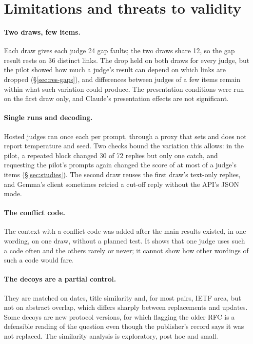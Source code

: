 \section{Limitations and threats to validity}
\label{sec:limitations}

\paragraph{Two draws, few items.} Each draw gives each judge 24 gap faults; the two draws share 12,
so the gap result rests on 36 distinct links. The drop held on both draws for every judge, but the pilot showed how much
a judge's result can depend on which links are dropped (\S\ref{sec:res-gaps}), and differences between judges of a few
items remain within what such variation could produce. The presentation conditions were run on the first draw only,
and Claude's presentation effects are not significant.

\paragraph{Single runs and decoding.} Hosted judges ran once each per prompt, through a proxy that sets and does not
report temperature and seed. Two checks bound the variation this allows: in the pilot, a repeated block changed 30 of
72 replies but only one catch, and requesting the pilot's prompts again changed the score of at most
\EOpusReaskChanged{} of a judge's \EOpusReaskItems{} items (\S\ref{sec:studies}). The second draw reuses the first
draw's text-only replies, and Gemma's client sometimes retried a cut-off reply without the API's JSON mode.

\paragraph{The conflict code.} The context with a conflict code was added after the main results existed, in one
wording, on one draw, without a planned test. It shows that one judge uses such a code often and the others rarely or
never; it cannot show how other wordings of such a code would fare.

\paragraph{The decoys are a partial control.} They are matched on dates, title similarity and, for most pairs, IETF
area, but not on abstract overlap, which differs sharply between replacements and updates. Some decoys are new
protocol versions, for which flagging the older RFC is a defensible reading of the question even though the
publisher's record says it was not replaced. The similarity analysis is exploratory, post hoc and small.

